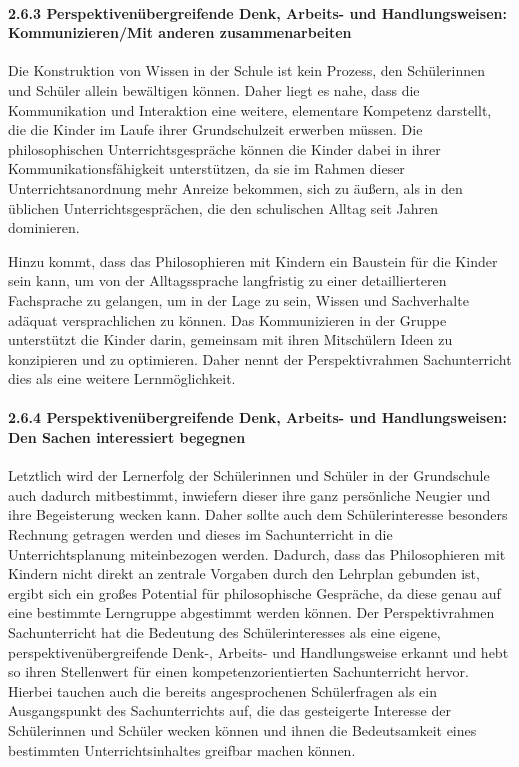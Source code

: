 \paragraph{2.6.3 Perspektivenübergreifende Denk, Arbeits- und Handlungsweisen: Kommunizieren/Mit anderen zusammenarbeiten}


Die Konstruktion von Wissen in der Schule ist kein Prozess, den Schülerinnen und Schüler allein bewältigen können. 
Daher liegt es nahe, dass die Kommunikation und Interaktion eine weitere, elementare Kompetenz darstellt, die die Kinder im Laufe ihrer Grundschulzeit erwerben müssen.
 Die philosophischen Unterrichtsgespräche können die Kinder dabei in ihrer Kommunikationsfähigkeit unterstützen, da sie im Rahmen dieser Unterrichtsanordnung mehr Anreize bekommen, sich zu äußern, als in den üblichen Unterrichtsgesprächen, die den schulischen Alltag seit Jahren dominieren.

Hinzu kommt, dass das Philosophieren mit Kindern ein Baustein für die Kinder sein kann, um von der Alltagssprache langfristig zu einer detaillierteren Fachsprache zu gelangen, um in der Lage zu sein, Wissen und Sachverhalte adäquat versprachlichen zu können\cite{GDS13, 24}.
Das Kommunizieren in der Gruppe unterstützt die Kinder darin, gemeinsam mit ihren Mitschülern Ideen zu konzipieren und zu optimieren. Daher nennt der Perspektivrahmen Sachunterricht dies als eine weitere Lernmöglichkeit.

\paragraph{2.6.4 Perspektivenübergreifende Denk, Arbeits- und Handlungsweisen: Den Sachen interessiert begegnen}


Letztlich wird der Lernerfolg der Schülerinnen und Schüler in der Grundschule auch dadurch mitbestimmt, inwiefern dieser ihre ganz persönliche Neugier und ihre Begeisterung wecken kann. 
Daher sollte auch dem Schülerinteresse besonders Rechnung getragen werden und dieses im Sachunterricht in die Unterrichtsplanung miteinbezogen werden.
 Dadurch, dass das Philosophieren mit Kindern nicht direkt an zentrale Vorgaben durch den Lehrplan gebunden ist, ergibt sich ein großes Potential für philosophische Gespräche, da diese genau auf eine bestimmte Lerngruppe abgestimmt werden können. 
Der Perspektivrahmen Sachunterricht hat die Bedeutung des Schülerinteresses als eine eigene, perspektivenübergreifende Denk-, Arbeits- und Handlungsweise erkannt und hebt so ihren Stellenwert für einen kompetenzorientierten Sachunterricht hervor. 
Hierbei tauchen auch die bereits angesprochenen Schülerfragen als ein Ausgangspunkt des Sachunterrichts auf, die das gesteigerte Interesse der Schülerinnen und Schüler wecken können und ihnen die Bedeutsamkeit eines bestimmten Unterrichtsinhaltes greifbar machen können. 

